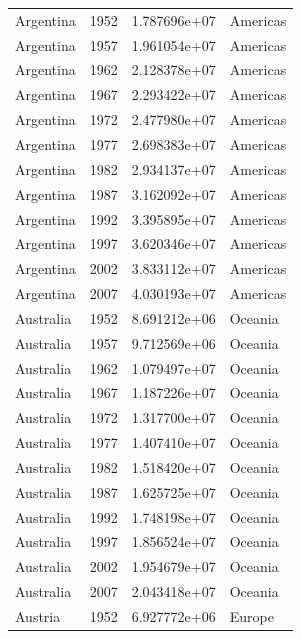 \documentclass[
  letterpaper,
  DIV=11,
  numbers=noendperiod]{scrreprt}
\begin{document}
\begin{tcolorbox}
\begin{tabular}{lrrl}
Argentina                &  1952 &  1.787696e+07 &  Americas \\
Argentina                &  1957 &  1.961054e+07 &  Americas \\
Argentina                &  1962 &  2.128378e+07 &  Americas \\
Argentina                &  1967 &  2.293422e+07 &  Americas \\
Argentina                &  1972 &  2.477980e+07 &  Americas \\
Argentina                &  1977 &  2.698383e+07 &  Americas \\
Argentina                &  1982 &  2.934137e+07 &  Americas \\
Argentina                &  1987 &  3.162092e+07 &  Americas \\
Argentina                &  1992 &  3.395895e+07 &  Americas \\
Argentina                &  1997 &  3.620346e+07 &  Americas \\
Argentina                &  2002 &  3.833112e+07 &  Americas \\
Argentina                &  2007 &  4.030193e+07 &  Americas \\
Australia                &  1952 &  8.691212e+06 &   Oceania \\
Australia                &  1957 &  9.712569e+06 &   Oceania \\
Australia                &  1962 &  1.079497e+07 &   Oceania \\
Australia                &  1967 &  1.187226e+07 &   Oceania \\
Australia                &  1972 &  1.317700e+07 &   Oceania \\
Australia                &  1977 &  1.407410e+07 &   Oceania \\
Australia                &  1982 &  1.518420e+07 &   Oceania \\
Australia                &  1987 &  1.625725e+07 &   Oceania \\
Australia                &  1992 &  1.748198e+07 &   Oceania \\
Australia                &  1997 &  1.856524e+07 &   Oceania \\
Australia                &  2002 &  1.954679e+07 &   Oceania \\
Australia                &  2007 &  2.043418e+07 &   Oceania \\
Austria                  &  1952 &  6.927772e+06 &    Europe \\

\end{tabular}
\end{tcolorbox}
\end{document}
